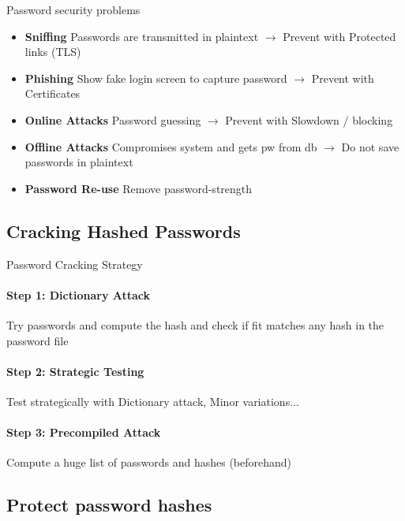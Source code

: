 \begin{definition}{Password security problems}\\
    \begin{itemize}
        \item \textbf{Sniffing} Passwords are transmitted in plaintext $\rightarrow$ Prevent with Protected links (TLS)
        \item \textbf{Phishing} Show fake login screen to capture password $\rightarrow$ Prevent with Certificates
        \item \textbf{Online Attacks} Password guessing $\rightarrow$ Prevent with Slowdown / blocking
        \item \textbf{Offline Attacks} Compromises system and gets pw from db $\rightarrow$ Do not save passwords in plaintext
        \item \textbf{Password Re-use} Remove password-strength
    \end{itemize}
\end{definition}

\subsection{Cracking Hashed Passwords}

\begin{KR}{Password Cracking Strategy}\\
    \paragraph{Step 1: Dictionary Attack}
    Try passwords and compute the hash and check if fit matches any hash in the password file
    
    \paragraph{Step 2: Strategic Testing}
    Test strategically with Dictionary attack, Minor variations...
    
    \paragraph{Step 3: Precompiled Attack}
    Compute a huge list of passwords and hashes (beforehand)
\end{KR}

\subsection{Protect password hashes}

